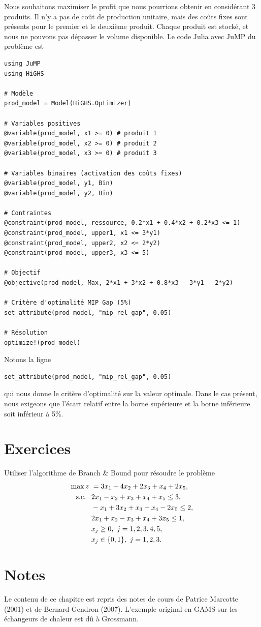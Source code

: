 \begin{example}
Nous souhaitons maximiser le profit que nous pourrions obtenir en considérant 3 produits.
Il n'y a pas de coût de production unitaire, mais des coûts fixes sont présents pour le premier et le deuxième produit.
Chaque produit est stocké, et nous ne pouvons pas dépasser le volume disponible.
Le code Julia avec JuMP du problème est
\begin{verbatim}
using JuMP
using HiGHS

# Modèle
prod_model = Model(HiGHS.Optimizer)

# Variables positives
@variable(prod_model, x1 >= 0) # produit 1
@variable(prod_model, x2 >= 0) # produit 2
@variable(prod_model, x3 >= 0) # produit 3

# Variables binaires (activation des coûts fixes)
@variable(prod_model, y1, Bin)
@variable(prod_model, y2, Bin)

# Contraintes
@constraint(prod_model, ressource, 0.2*x1 + 0.4*x2 + 0.2*x3 <= 1)
@constraint(prod_model, upper1, x1 <= 3*y1)
@constraint(prod_model, upper2, x2 <= 2*y2)
@constraint(prod_model, upper3, x3 <= 5)

# Objectif
@objective(prod_model, Max, 2*x1 + 3*x2 + 0.8*x3 - 3*y1 - 2*y2)

# Critère d'optimalité MIP Gap (5%)
set_attribute(prod_model, "mip_rel_gap", 0.05)

# Résolution
optimize!(prod_model)
\end{verbatim}
Notons la ligne
 \begin{verbatim}
set_attribute(prod_model, "mip_rel_gap", 0.05)
\end{verbatim}
qui nous donne le critère d'optimalité sur la valeur optimale.
Dans le cas présent, nous exigeons que l'écart relatif entre la borne supérieure et la borne inférieure soit inférieur à 5\%.
\end{example}

\section{Exercices}

\begin{exercise}
Utiliser l'algorithme de Branch \& Bound pour résoudre le problème
\begin{align*}
\max z\ &= 3x_1 + 4x_2 + 2x_3 + x_4 +2x_5,\\
\mbox{s.c. }{}\ & 2x_1 - x_2 + x_3 + x_4 +x_5 \leq 3, \\
& -x_1+3x_2 + x_3 - x_4 - 2x_5 \leq 2, \\
& 2x_1 + x_2 - x_3 + x_4 +3x_5 \leq 1,\\
& x_j \geq 0,\ j = 1,2,3,4,5,\\
& x_j \in \lbrace 0, 1\rbrace,\ j = 1, 2, 3.
\end{align*}
\end{exercise}

\section{Notes}

Le contenu de ce chapitre est repris des notes de cours de Patrice Marcotte (2001) et de Bernard Gendron (2007).
L'exemple original en GAMS sur les échangeurs de chaleur est dû à Grossmann.